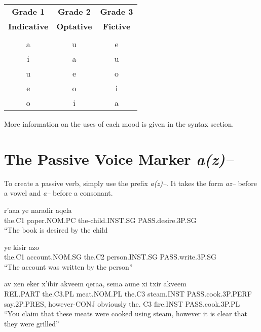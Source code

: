 \documentclass[oneside]{book}
\begin{document}
\begin{center}
	\begin{tabular}{c c c} \\
\textbf{Grade 1} & \textbf{Grade 2} & \textbf{Grade 3} \\
\textbf{Indicative} & \textbf{Optative} & \textbf{Fictive} \\
\hline \\

a & u & e \\
i & a & u \\
u & e & o \\
e & o & i \\
o & i & a  \\


\end{tabular}

\end{center}






More information on the uses of each mood is given in the syntax section.


\section{The Passive Voice Marker \textit{a(z)--}}
To create a passive verb, simply use the prefix \textit{a(z)--}. It takes the form \textit{az--} before a vowel and \textit{a--} before a consonant.
\begin{exe}

  \ex
  \gll  r'aaa {ye naradir} aqela\\
  the.C1 paper.NOM.PC the-child.INST.SG PASS.desire.3P.SG\\
  \trans ``The book is desired by the child

  \ex
   {ye kisir} azo\\
  {the.C1 account.NOM.SG} {the.C2 person.INST.SG} PASS.write.3P.SG \\
  \trans ``The account was written by the person''

  \ex
  \gll  av {xen eker} x'ibir akveem qeraa, sema aune {xi txir} akveem \\
  REL.PART {the.C3.PL meat.NOM.PL} {the.C3 steam.INST} PASS.cook.3P.PERF say.2P.PRES, however-CONJ obviously {the. C3 fire.INST} PASS.cook.3P.PL \\
  \trans ``You claim that these meats were cooked using steam, however it is clear that they were grilled''

\end{exe}
\end{document}
